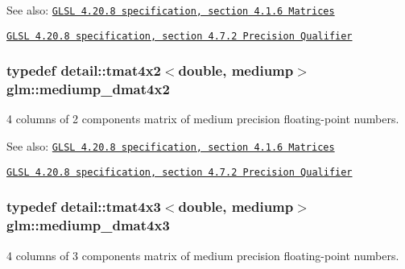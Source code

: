 \begin{Desc}
\item[See also:]\href{http://www.opengl.org/registry/doc/GLSLangSpec.4.20.8.pdf}{\tt GLSL 4.20.8 specification, section 4.1.6 Matrices} 

\href{http://www.opengl.org/registry/doc/GLSLangSpec.4.20.8.pdf}{\tt GLSL 4.20.8 specification, section 4.7.2 Precision Qualifier} \end{Desc}
\hypertarget{group__core__precision_g03056b616496470371473cd5df4dc1f8}{
\subsubsection[mediump\_\-dmat4x2]{\setlength{\rightskip}{0pt plus 5cm}typedef detail::tmat4x2$<$double, mediump$>$ {\bf glm::mediump\_\-dmat4x2}}}
\label{group__core__precision_g03056b616496470371473cd5df4dc1f8}


4 columns of 2 components matrix of medium precision floating-point numbers.

\begin{Desc}
\item[See also:]\href{http://www.opengl.org/registry/doc/GLSLangSpec.4.20.8.pdf}{\tt GLSL 4.20.8 specification, section 4.1.6 Matrices} 

\href{http://www.opengl.org/registry/doc/GLSLangSpec.4.20.8.pdf}{\tt GLSL 4.20.8 specification, section 4.7.2 Precision Qualifier} \end{Desc}
\hypertarget{group__core__precision_gfa1ba33d2748737129cde471fedbf9c5}{
\subsubsection[mediump\_\-dmat4x3]{\setlength{\rightskip}{0pt plus 5cm}typedef detail::tmat4x3$<$double, mediump$>$ {\bf glm::mediump\_\-dmat4x3}}}
\label{group__core__precision_gfa1ba33d2748737129cde471fedbf9c5}


4 columns of 3 components matrix of medium precision floating-point numbers.

